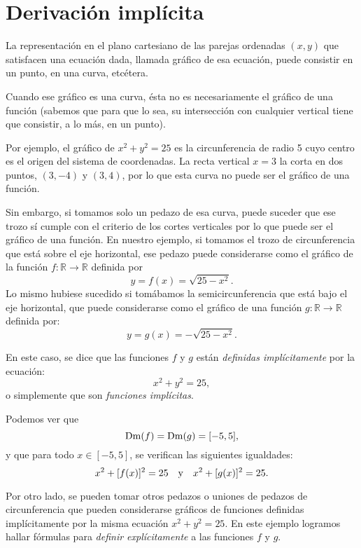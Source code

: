 \section{Derivación implícita}

La representación en el plano cartesiano de las parejas ordenadas $(x,y)$ que satisfacen una
ecuación dada, llamada gráfico de esa ecuación, puede consistir en un punto, en una curva,
etcétera.

Cuando ese gráfico es una curva, ésta no es necesariamente el gráfico de una función (sabemos que
para que lo sea, su intersección con cualquier vertical tiene que consistir, a lo más, en un
punto).

Por ejemplo, el gráfico de $x^{2}+y^{2}=25$ es la circunferencia de radio 5 cuyo centro es el
origen del sistema de coordenadas. La recta vertical $x=3$ la corta en dos puntos, $(3,-4)$ y
$(3,4)$, por lo que esta curva no puede ser el gráfico de una función.

Sin embargo, si tomamos solo un pedazo de esa curva, puede suceder que ese trozo sí cumple con el
criterio de los cortes verticales por lo que puede ser el gráfico de una función. En nuestro
ejemplo, si tomamos el trozo de circunferencia que está sobre el eje horizontal, ese pedazo puede
considerarse como el gráfico de la función $f\colon\mathbb{R}  \rightarrow \mathbb{R}$ definida por
\begin{equation*}
	y=f(x)=\sqrt{25-x^{2}}.
\end{equation*}
Lo mismo hubiese sucedido si tomábamos la semicircunferencia que está bajo el eje horizontal, que
puede considerarse como el gráfico de una función $g\colon\mathbb{R}  \rightarrow \mathbb{R}$
definida por:
\begin{equation*}
	y=g(x)=-\sqrt{25-x^{2}}.
\end{equation*}

En este caso, se dice que las funciones $f$ y $g$ están \emph{definidas implícitamente} por la
ecuación:
\begin{equation*}
	x^{2}+y^{2}=25,
\end{equation*}
o simplemente que son \emph{funciones implícitas}.

Podemos ver que
\[
\operatorname{Dm}(f) = \operatorname{Dm}(g) = [-5,5],
\]
y que para todo $x\in [-5,5]$, se verifican las siguientes igualdades:
\begin{equation*}
	x^{2}+[f(x)]^{2}=25
\quad\text{y}\quad
	x^{2}+[g(x)]^{2}=25.
\end{equation*}

Por otro lado, se pueden tomar otros pedazos o uniones de pedazos de circunferencia que pueden
considerarse gráficos de funciones definidas implícitamente por la misma ecuación $x^{2}+y^{2}=25$.
En este ejemplo logramos hallar fórmulas para \emph{definir explícitamente} a las funciones $f$ y
$g$.

